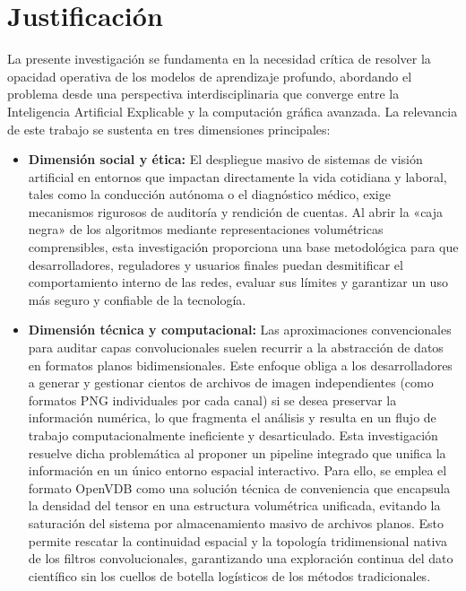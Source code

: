 \section{Justificación}
La presente investigación se fundamenta en la necesidad crítica de resolver la opacidad operativa de los 
modelos de aprendizaje profundo, abordando el problema desde una perspectiva interdisciplinaria que converge 
entre la Inteligencia Artificial Explicable y la computación gráfica avanzada. La relevancia de este trabajo 
se sustenta en tres dimensiones principales:

\begin{itemize}
    \item \textbf{Dimensión social y ética:} El despliegue masivo de sistemas de visión 
    artificial en entornos que impactan directamente la vida cotidiana y laboral, tales como la conducción 
    autónoma o el diagnóstico médico, exige mecanismos rigurosos de auditoría y rendición de cuentas. 
    Al abrir la «caja negra» de los algoritmos mediante representaciones volumétricas comprensibles, esta 
    investigación proporciona una base metodológica para que desarrolladores, reguladores y usuarios finales 
    puedan desmitificar el comportamiento interno de las redes, evaluar sus límites y garantizar un uso más 
    seguro y confiable de la tecnología.
    
    \item \textbf{Dimensión técnica y computacional:} Las aproximaciones convencionales para auditar capas 
    convolucionales suelen recurrir a la abstracción de datos en formatos planos bidimensionales. Este 
    enfoque obliga a los desarrolladores a generar y gestionar cientos de archivos de imagen independientes 
    (como formatos PNG individuales por cada canal) si se desea preservar la información numérica, lo que 
    fragmenta el análisis y resulta en un flujo de trabajo computacionalmente ineficiente y desarticulado. 
    Esta investigación resuelve dicha problemática al proponer un pipeline integrado que unifica la 
    información en un único entorno espacial interactivo. Para ello, se emplea el formato OpenVDB como 
    una solución técnica de conveniencia que encapsula la densidad del tensor en una estructura volumétrica 
    unificada, evitando la saturación del sistema por almacenamiento masivo de archivos planos. Esto permite 
    rescatar la continuidad espacial y la topología tridimensional nativa de los filtros convolucionales, 
    garantizando una exploración continua del dato científico sin los cuellos de botella logísticos de 
    los métodos tradicionales.
    

\end{itemize}
